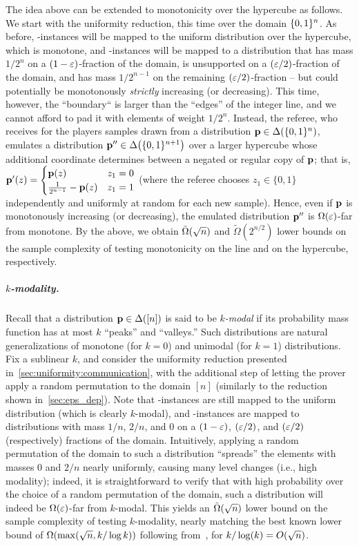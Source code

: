  The idea above can be extended to monotonicity over the hypercube as follows. We start with the uniformity reduction, this time over the domain $\{0,1\}^n$. As before, \yes-instances will be mapped to the uniform distribution over the hypercube, which is monotone, and \no-instances will be mapped to a distribution that has mass $1/2^n$ on a $(1-\varepsilon)$-fraction of the domain, is unsupported on a $(\varepsilon/2)$-fraction of the domain, and has mass $1/2^{n-1}$ on the remaining $(\varepsilon/2)$-fraction -- but could potentially be monotonously \emph{strictly} increasing (or decreasing). This time, however, the ``boundary`` is larger than the ``edges'' of the integer line, and we cannot afford to pad it with elements of weight $1/2^n$. Instead, the referee, who receives for the players samples drawn from a distribution $\mathbf{p}\in\Delta\!\left(\{0,1\}^n\right)$, emulates a distribution $\mathbf{p}''\in\Delta\!\left(\{0,1\}^{n+1}\right)$ over a larger hypercube whose additional coordinate determines between a negated or regular copy of $\mathbf{p}$; that is, 
 $\mathbf{p}'(z) = 
 \begin{cases}
	\mathbf{p}(z) & z_1 = 0 \\
  \frac{1}{2^{n-1}} -\mathbf{p}(z) & z_1 = 1
 \end{cases}$ (where the referee chooses $z_1\in\{0,1\}$ independently and uniformly at random for each new sample). Hence, even if $\mathbf{p}$ is monotonously increasing (or decreasing), the emulated distribution $\mathbf{p}''$ is $\bigOmega{\eps}$-far from monotone.
 By the above, we obtain $\tildeOmega{\sqrt{n}}$ and $\tilde{\Omega}(2^{n/2})$ lower bounds on the sample complexity of testing monotonicity on the line and on the hypercube, respectively.
 

\subparagraph{$k$-modality.} Recall that a distribution $\mathbf{p}\in\Delta\!\left([n]\right)$ is said to be \emph{$k$-modal} if its probability mass function has at most $k$ ``peaks'' and ``valleys.'' Such distributions are natural generalizations of monotone (for $k = 0$) and unimodal (for $k = 1$) distributions. Fix a sublinear $k$, and consider the uniformity reduction presented in~\cref{sec:uniformity:communication}, with the additional step of letting the prover apply a random permutation to the domain $[n]$ (similarly to the reduction shown in~\cref{sec:eps_dep}). Note that \yes-instances are still mapped to the uniform distribution (which is clearly $k$-modal), and \no-instances are mapped to distributions with mass $1/n$, $2/n$, and $0$ on a $(1-\varepsilon)$, $(\varepsilon/2)$, and $(\varepsilon/2)$ (respectively) fractions of the domain. Intuitively, applying a random permutation of the domain to such a distribution ``spreads'' the elements with masses $0$ and $2/n$ nearly uniformly, causing many level changes (i.e., high modality); indeed, it is straightforward to verify that with high probability over the choice of a random permutation of the domain, such a distribution will indeed be $\bigOmega{\eps}$-far from $k$-modal. This yields an $\tildeOmega{\sqrt{n}}$ lower bound on the sample complexity of testing $k$-modality, nearly matching the best known lower bound of $\bigOmega{\max( \sqrt{n}, k/\log k)}$ following from~\cite{Canonne:16}, for $k/\log(k) = \bigO{\sqrt{n}}$.

